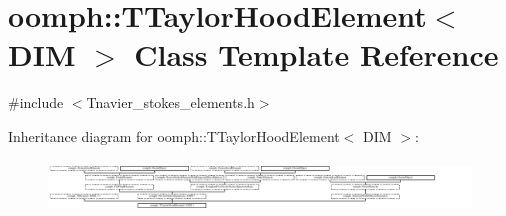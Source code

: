 \hypertarget{classoomph_1_1TTaylorHoodElement}{}\section{oomph\+:\+:T\+Taylor\+Hood\+Element$<$ D\+IM $>$ Class Template Reference}
\label{classoomph_1_1TTaylorHoodElement}


{\ttfamily \#include $<$Tnavier\+\_\+stokes\+\_\+elements.\+h$>$}

Inheritance diagram for oomph\+:\+:T\+Taylor\+Hood\+Element$<$ D\+IM $>$\+:\begin{figure}[H]
\begin{center}
\leavevmode
\includegraphics[height=1.393035cm]{classoomph_1_1TTaylorHoodElement}
\end{center}
\end{figure}
